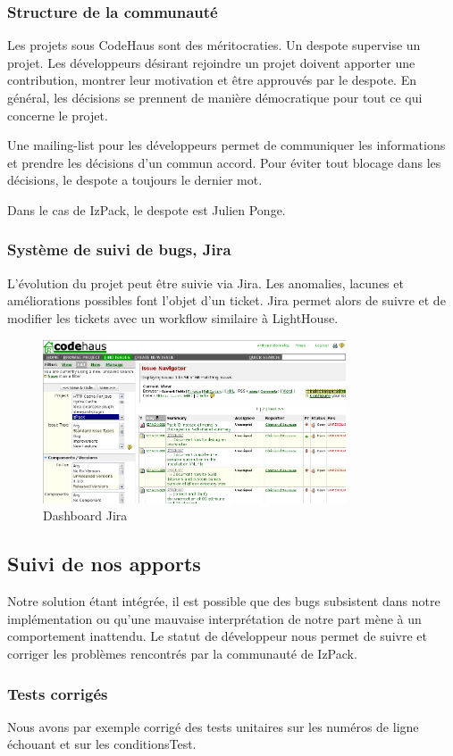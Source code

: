 \subsubsection{Structure de la communauté}
Les projets sous CodeHaus sont des méritocraties.
Un despote supervise un projet.
Les développeurs désirant rejoindre un projet doivent apporter une contribution, montrer leur motivation et être approuvés par le despote.
En général, les décisions se prennent de manière démocratique pour tout ce qui concerne le projet.

Une mailing-list pour les développeurs permet de communiquer les informations et prendre les décisions d'un commun accord.
Pour éviter tout blocage dans les décisions, le despote a toujours le dernier mot.

Dans le cas de IzPack, le despote est Julien Ponge.
\subsubsection{Système de suivi de bugs, Jira}
L'évolution du projet peut être suivie via Jira.
Les anomalies, lacunes et améliorations possibles font l'objet d'un ticket.
Jira permet alors de suivre et de modifier les tickets avec un workflow similaire à LightHouse.
\begin{figure}[H]
	\centering
	\includegraphics[width=0.8\textwidth]{../image/jira.png}
	\caption{Dashboard Jira}
\end{figure}
\subsection{Suivi de nos apports}
Notre solution étant intégrée, il est possible que des bugs subsistent dans notre implémentation ou qu'une mauvaise interprétation de notre part mène à un comportement inattendu.
Le statut de développeur nous permet de suivre et corriger les problèmes rencontrés par la communauté de IzPack.
\subsubsection{Tests corrigés}
Nous avons par exemple corrigé des tests unitaires sur les numéros de ligne échouant et sur les conditionsTest.

